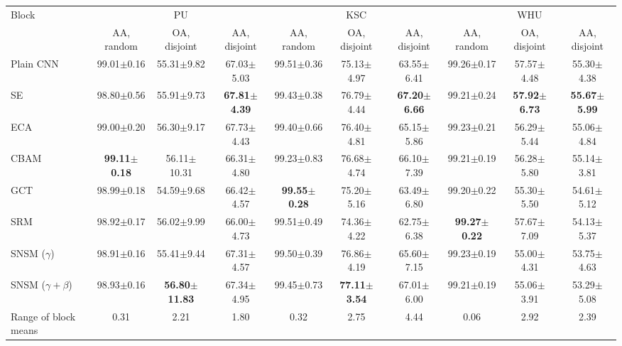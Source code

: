 \begin{tabular}{lccccccccc}
\toprule
Block & \multicolumn{3}{c}{PU} & \multicolumn{3}{c}{KSC} & \multicolumn{3}{c}{WHU} \\
 & AA, random & OA, disjoint & AA, disjoint & AA, random & OA, disjoint & AA, disjoint & AA, random & OA, disjoint & AA, disjoint \\
\midrule
Plain CNN & 99.01$\pm$0.16 & 55.31$\pm$9.82 & 67.03$\pm$5.03 & 99.51$\pm$0.36 & 75.13$\pm$4.97 & 63.55$\pm$6.41 & 99.26$\pm$0.17 & 57.57$\pm$4.48 & 55.30$\pm$4.38 \\
SE & 98.80$\pm$0.56 & 55.91$\pm$9.73 & \textbf{67.81$\pm$4.39} & 99.43$\pm$0.38 & 76.79$\pm$4.44 & \textbf{67.20$\pm$6.66} & 99.21$\pm$0.24 & \textbf{57.92$\pm$6.73} & \textbf{55.67$\pm$5.99} \\
ECA & 99.00$\pm$0.20 & 56.30$\pm$9.17 & 67.73$\pm$4.43 & 99.40$\pm$0.66 & 76.40$\pm$4.81 & 65.15$\pm$5.86 & 99.23$\pm$0.21 & 56.29$\pm$5.44 & 55.06$\pm$4.84 \\
CBAM & \textbf{99.11$\pm$0.18} & 56.11$\pm$10.31 & 66.31$\pm$4.80 & 99.23$\pm$0.83 & 76.68$\pm$4.74 & 66.10$\pm$7.39 & 99.21$\pm$0.19 & 56.28$\pm$5.80 & 55.14$\pm$3.81 \\
GCT & 98.99$\pm$0.18 & 54.59$\pm$9.68 & 66.42$\pm$4.57 & \textbf{99.55$\pm$0.28} & 75.20$\pm$5.16 & 63.49$\pm$6.80 & 99.20$\pm$0.22 & 55.30$\pm$5.50 & 54.61$\pm$5.12 \\
SRM & 98.92$\pm$0.17 & 56.02$\pm$9.99 & 66.00$\pm$4.73 & 99.51$\pm$0.49 & 74.36$\pm$4.22 & 62.75$\pm$6.38 & \textbf{99.27$\pm$0.22} & 57.67$\pm$7.09 & 54.13$\pm$5.37 \\
SNSM ($\gamma$) & 98.91$\pm$0.16 & 55.41$\pm$9.44 & 67.31$\pm$4.57 & 99.50$\pm$0.39 & 76.86$\pm$4.19 & 65.60$\pm$7.15 & 99.23$\pm$0.19 & 55.00$\pm$4.31 & 53.75$\pm$4.63 \\
SNSM ($\gamma{+}\beta$) & 98.93$\pm$0.16 & \textbf{56.80$\pm$11.83} & 67.34$\pm$4.95 & 99.45$\pm$0.73 & \textbf{77.11$\pm$3.54} & 67.01$\pm$6.00 & 99.21$\pm$0.19 & 55.06$\pm$3.91 & 53.29$\pm$5.08 \\
\midrule
Range of block means & 0.31 & 2.21 & 1.80 & 0.32 & 2.75 & 4.44 & 0.06 & 2.92 & 2.39 \\
\bottomrule
\end{tabular}
